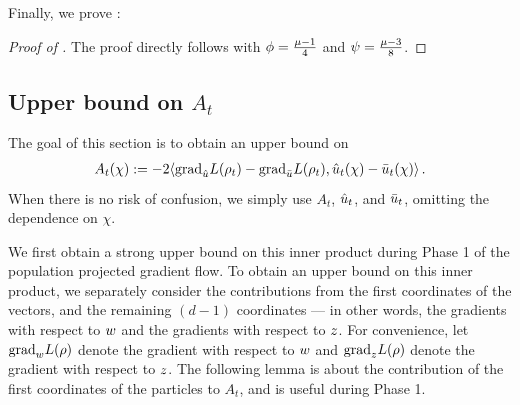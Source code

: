 Finally, we prove :


\begin{proof}[Proof of ]
The proof directly follows  with $\phi = \frac{\mu-1}{4}$ and $\psi = \frac{\mu-3}{8}$.
\end{proof}

\subsection{Upper bound on $A_t$}\label{sec:proof_at}

The goal of this section is to obtain an upper bound on
\begin{align}
A_t(\chi) := - 2 \langle {\textup{grad}}_{\hat{u}} L(\rho_t) - {\textup{grad}}_{\bar{u}} L(\rho_t), \hat{u}_t(\chi) - \bar{u}_t(\chi) \rangle \,.
\end{align}
When there is no risk of confusion, we simply use $A_t$, $\hat{u}_t$, and $\bar{u}_t$, omitting the dependence on $\chi$.

We first obtain a strong upper bound on this inner product during Phase 1 of the population projected gradient flow. To obtain an upper bound on this inner product, we separately consider the contributions from the first coordinates of the vectors, and the remaining $(d - 1)$ coordinates --- in other words, the gradients with respect to $w$ and the gradients with respect to $z$. For convenience, let ${\textup{grad}}_w L(\rho)$ denote the gradient with respect to $w$ and ${\textup{grad}}_z L(\rho)$ denote the gradient with respect to $z$. The following lemma is about the contribution of the first coordinates of the particles to $A_t$, and is useful during Phase 1.

